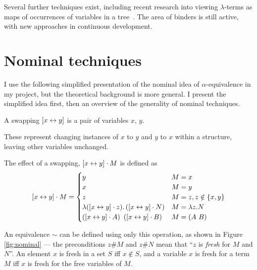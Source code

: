 Several further techniques exist, including recent research into viewing \(\lambda\)-terms as maps of occurrences of variables in a tree~\cite{term-maps}.
The area of binders is still active, with new approaches in continuous development.

\section{Nominal techniques}
\label{sec:nominal-intro}
I use the following simplified presentation of the nominal idea of \(\alpha\)-equivalence in my project, but the theoretical background is more general.
I present the simplified idea first, then an overview of the generality of nominal techniques.

\begin{definition}
A swapping \([x \leftrightarrow y]\) is a pair of variables \(x\), \(y\).
\end{definition}

These represent changing instances of \(x\) to \(y\) and \(y\) to \(x\) within a structure, leaving other variables unchanged.

\begin{definition}
The effect of a swapping, \([x \leftrightarrow y] \cdot M\) is defined as
\[
[x \leftrightarrow y] \cdot M =
\begin{cases}
y & M = x\\
x & M = y\\
z & M = z, z \notin \{x, y\}\\
\lambda ([x \leftrightarrow y] \cdot z). \left([x \leftrightarrow y] \cdot N\right) & M = \lambda z.N\\
\left([x \leftrightarrow y] \cdot A\right)\ \left([x \leftrightarrow y] \cdot B\right) & M = \left(A\ B\right)
\end{cases}
\]
\end{definition}

An equivalence \(\sim\) can be defined using only this operation, as shown in Figure \ref{fig:nominal} --- the preconditions \(z \# M\) and \(z \# N\) mean that ``\(z\) is \emph{fresh} for \(M\) and \(N\)''.
An element \(x\) is fresh in a set \(S\) iff \(x \notin S\), and a variable \(x\) is fresh for a term \(M\) iff \(x\) is fresh for the free variables of \(M\).

